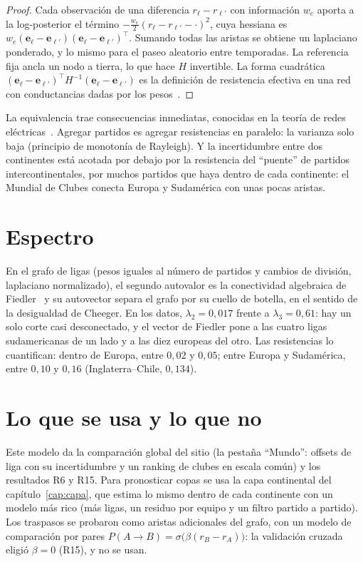 \begin{proof}
Cada observación de una diferencia $r_\ell-r_{\ell'}$ con información $w_e$ aporta a la log-posterior el término $-\tfrac{w_e}2(r_\ell-r_{\ell'}-\cdot)^2$, cuya hessiana es $w_e(\mathbf e_\ell-\mathbf e_{\ell'})(\mathbf e_\ell-\mathbf e_{\ell'})^\top$. Sumando todas las aristas se obtiene un laplaciano ponderado, y lo mismo para el paseo aleatorio entre temporadas. La referencia fija ancla un nodo a tierra, lo que hace $H$ invertible. La forma cuadrática $(\mathbf e_\ell-\mathbf e_{\ell'})^\top H^{-1}(\mathbf e_\ell-\mathbf e_{\ell'})$ es la definición de resistencia efectiva en una red con conductancias dadas por los pesos~\cite{kleinrandic1993}.
\end{proof}

La equivalencia trae consecuencias inmediatas, conocidas en la teoría de redes eléctricas~\cite{doylesnell1984}. Agregar partidos es agregar resistencias en paralelo: la varianza solo baja (principio de monotonía de Rayleigh). Y la incertidumbre entre dos continentes está acotada por debajo por la resistencia del ``puente'' de partidos intercontinentales, por muchos partidos que haya dentro de cada continente: el Mundial de Clubes conecta Europa y Sudamérica con unas pocas aristas.

\section{Espectro}

En el grafo de ligas (pesos iguales al número de partidos y cambios de división, laplaciano normalizado), el segundo autovalor es la conectividad algebraica de Fiedler~\cite{fiedler1973} y su autovector separa el grafo por su cuello de botella, en el sentido de la desigualdad de Cheeger. En los datos, $\lambda_2=0{,}017$ frente a $\lambda_3=0{,}61$: hay un solo corte casi desconectado, y el vector de Fiedler pone a las cuatro ligas sudamericanas de un lado y a las diez europeas del otro. Las resistencias lo cuantifican: dentro de Europa, entre $0{,}02$ y $0{,}05$; entre Europa y Sudamérica, entre $0{,}10$ y $0{,}16$ (Inglaterra–Chile, $0{,}134$).

\section{Lo que se usa y lo que no}

Este modelo da la comparación global del sitio (la pestaña ``Mundo'': offsets de liga con su incertidumbre y un ranking de clubes en escala común) y los resultados R6 y R15. Para pronosticar copas se usa la capa continental del capítulo~\ref{cap:capa}, que estima lo mismo dentro de cada continente con un modelo más rico (más ligas, un residuo por equipo y un filtro partido a partido). Los traspasos se probaron como aristas adicionales del grafo, con un modelo de comparación por pares $P(A\to B)=\sigma\big(\beta(r_B-r_A)\big)$: la validación cruzada eligió $\beta=0$ (R15), y no se usan.
